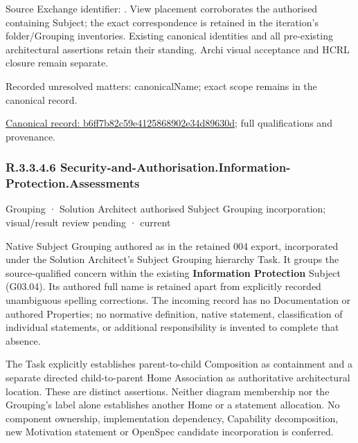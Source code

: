 Source Exchange identifier: \texttt{}. View placement corroborates
the authorised containing Subject; the exact correspondence is retained in the
iteration's folder/Grouping inventories. Existing canonical identities and all
pre-existing architectural assertions retain their standing. Archi visual
acceptance and HCRL closure remain separate.


{\small Recorded unresolved matters: canonicalName; exact scope remains in the canonical record.}\par
{\footnotesize \href{../../../../continuum/grouping/b6ff7b82c59e4125868902e34d89630d.md}{Canonical record: b6ff7b82c59e4125868902e34d89630d}; full qualifications and provenance.}\par
\subsubsection*{R.3.3.4.6 Security-and-Authorisation.Information-Protection.Assessments}
\label{navigation:R.3.3.4.6}

\label{element:0caf2fb84f944a6ab3872feb92b9338d}
{\small Grouping · Solution Architect authorised Subject Grouping incorporation; visual/result review pending · current}\par

Native Subject Grouping authored as \texttt{} in the retained 004 export,
incorporated under the Solution Architect's Subject Grouping hierarchy Task.
It groups the source-qualified \texttt{} concern within
the existing \textbf{Information Protection} Subject (G03.04). Its authored full name
is retained apart from explicitly recorded unambiguous spelling corrections.
The incoming record has no Documentation or authored Properties; no normative
definition, native statement, classification of individual statements, or
additional responsibility is invented to complete that absence.



The Task explicitly establishes parent-to-child Composition as containment and
a separate directed child-to-parent Home Association as authoritative architectural
location. These are distinct assertions. Neither diagram membership nor the
Grouping's label alone establishes another Home or a statement allocation.
No component ownership, implementation dependency, Capability decomposition,
new Motivation statement or OpenSpec candidate incorporation is conferred.



